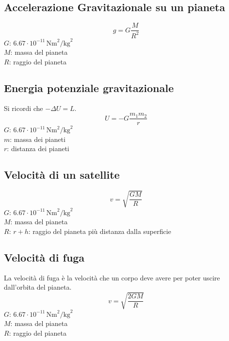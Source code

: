 \subsection{Accelerazione Gravitazionale su un pianeta}
\begin{equation*}
  g = G\frac{M}{R^2}
\end{equation*}
\hyperref[tab:G]{$G$}: $6.67\cdot10^{-11}\,\text{Nm}^2\text{/kg}^2$\\
$M$: massa del pianeta\\
$R$: raggio del pianeta

\subsection{Energia potenziale gravitazionale}
Si ricordi che $-\Delta U = L$.
\begin{equation*}
  U =-G \frac{m_1m_2}{r}
\end{equation*}
\hyperref[tab:G]{$G$}: $6.67\cdot10^{-11}\,\text{Nm}^2\text{/kg}^2$\\
$m$: massa dei pianeti\\
$r$: distanza dei pianeti

\subsection{Velocità di un satellite}
\begin{equation*}
  v = \sqrt{\frac{GM}{R}}
\end{equation*}
\hyperref[tab:g]{$G$}: $6.67\cdot10^{-11}\,\text{Nm}^2\text{/kg}^2$\\
$M$: massa del pianeta\\
$R$: $r + h$: raggio del pianeta più distanza dalla superficie

\subsection{Velocità di fuga}
La velocità di fuga è la velocità che un corpo deve avere per poter uscire dall'orbita del pianeta.
\begin{equation*}
  v = \sqrt{\frac{2GM}{R}}
\end{equation*}
\hyperref[tab:g]{$G$}: $6.67\cdot10^{-11}\,\text{Nm}^2\text{/kg}^2$\\
$M$: massa del pianeta\\
$R$: raggio del pianeta\\
